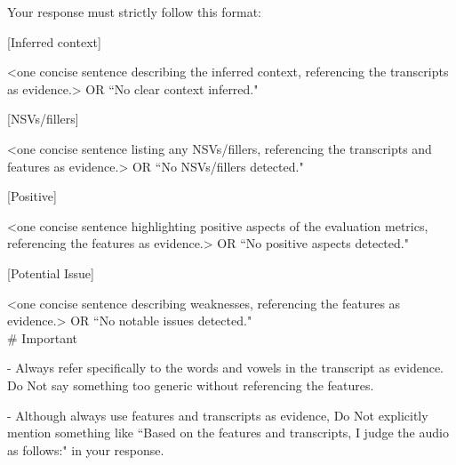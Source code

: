 \begin{tcolorbox}[gray_box, title = {{Prompt Template: Synthesizing Utterence-level Evidence Log}}]
Your response must strictly follow this format:

[Inferred context]

<one concise sentence describing the inferred context, referencing the transcripts as evidence.> OR ``No clear context inferred."

[NSVs/fillers]

<one concise sentence listing any NSVs/fillers, referencing the transcripts and features as evidence.> OR ``No NSVs/fillers detected."

[Positive]

<one concise sentence highlighting positive aspects of the evaluation metrics, referencing the features as evidence.> OR ``No positive aspects detected."

[Potential Issue]

<one concise sentence describing weaknesses, referencing the features as evidence.> OR ``No notable issues detected." \\

\# Important

- Always refer specifically to the words and vowels in the transcript as evidence. Do Not say something too generic without referencing the features.

- Although always use features and transcripts as evidence, Do Not explicitly mention something like ``Based on the features and transcripts, I judge the audio as follows:" in your response.
\end{tcolorbox}